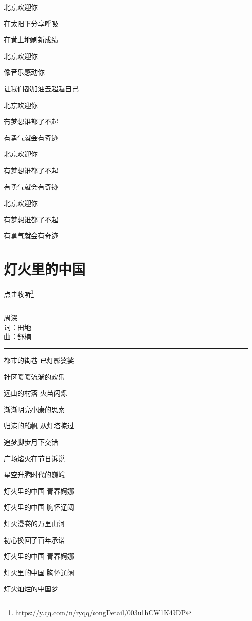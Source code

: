\documentclass[]{ctexbook}
\renewcommand{\href}[2]{#2\footnote{\url{#1}}}
\begin{document}
北京欢迎你

在太阳下分享呼吸

在黄土地刷新成绩

北京欢迎你

像音乐感动你

让我们都加油去超越自己

北京欢迎你

有梦想谁都了不起

有勇气就会有奇迹

北京欢迎你

有梦想谁都了不起

有勇气就会有奇迹

北京欢迎你

有梦想谁都了不起

有勇气就会有奇迹

\section*{灯火里的中国}\label{China-in-the-light}


\href{https://y.qq.com/n/ryqq/songDetail/003u1hCW1K49DP}{点击收听}

\begin{center}\rule{0.5\linewidth}{0.5pt}\end{center}

周深\\
词：田地\\
曲：舒楠

\begin{center}\rule{0.5\linewidth}{0.5pt}\end{center}

都市的街巷 已灯影婆娑

社区暖暖流淌的欢乐

远山的村落 火苗闪烁

渐渐明亮小康的思索

归港的船帆 从灯塔掠过

追梦脚步月下交错

广场焰火在节日诉说

星空升腾时代的巍峨

灯火里的中国 青春婀娜

灯火里的中国 胸怀辽阔

灯火漫卷的万里山河

初心换回了百年承诺

灯火里的中国 青春婀娜

灯火里的中国 胸怀辽阔

灯火灿烂的中国梦
\end{document}
